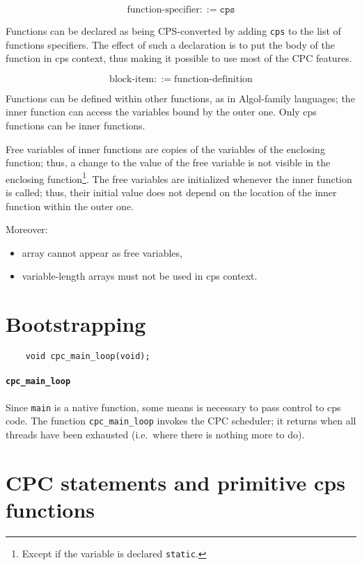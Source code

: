 \documentclass[a4paper]{report}
\begin{document}
\[ \mbox{function-specifier} ::= \mathtt{cps} \]

Functions can be declared as being CPS-converted by adding {\tt cps}
to the list of functions specifiers.  The effect of such a declaration
is to put the body of the function in cps context, thus making it
possible to use most of the CPC features.

\[ \mbox{block-item} ::= \mbox{function-definition} \]

Functions can be defined within other functions, as in Algol-family
languages; the inner function can access the variables bound by the
outer one.  Only cps functions can be inner functions.

Free variables of inner functions are copies of the variables of the
enclosing function; thus, a change to the value of the free variable
is not visible in the enclosing function\footnote{Except if the variable
is declared {\tt static}.}.  The free variables are initialized whenever
the inner function is called; thus, their initial value does not depend
on the location of the inner function within the outer one.

Moreover:
\begin{itemize}
  \item array cannot appear as free variables,
  \item variable-length arrays must not be used in cps context.
\end{itemize}

\section{Bootstrapping} \label{sec:bootstrapping}

\begin{verbatim}
    void cpc_main_loop(void);
\end{verbatim}

\paragraph{\tt cpc\_main\_loop} Since \verb|main| is a native
function, some means is necessary to pass control to cps code.  The
function \verb|cpc_main_loop| invokes the CPC scheduler; it returns
when all threads have been exhausted (i.e.\ where there is
nothing more to do).

\section{CPC statements and primitive cps functions}
\end{document}
